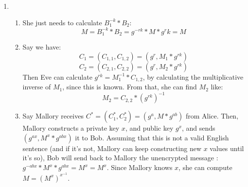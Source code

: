 \begin{enumerate}
  \item
    \begin{enumerate}
      \item She just needs to calculate $B_1^{-k} * B_2$:
        $$ M = B_1^{-k} * B_2 = g^{-rk} * M * g^rk = M $$
      \item Say we have:
        $$C_1 = (C_{1,1}, C_{1,2}) = (g^r, M_1 * g^{rk})$$
        $$C_2 = (C_{2,1}, C_{2,2}) = (g^r, M_2 * g^{rk})$$
        Then Eve can calculate $g^{rk} = M_1^{-1} * C_{1,2}$, by calculating the multiplicative inverse of $M_1$, since this is known. From that, she can find $M_2$ like:
        $$M_2 = C_{2,2} * (g^{rk})^{-1}$$

      \item Say Mallory receives $C^* = (C_1^*, C_2^*) = (g^a, M * g^{ab})$ from Alice. Then, Mallory constructs a private key $x$, and public key $g^x$, and sends $(g^{ax}, M^x * g^{abx})$ it to Bob. Assuming that this is not a valid English sentence (and if it's not, Mallory can keep constructing new $x$ values until it's so), Bob will send back to Mallory the unencrypted message : $g^{-abx} * M^x * g^{abx} = M^x = M^x$. Since Mallory knows $x$, she can compute $M = (M^x)^{x^{-1}}$.
    \end{enumerate}

  \end{enumerate}

